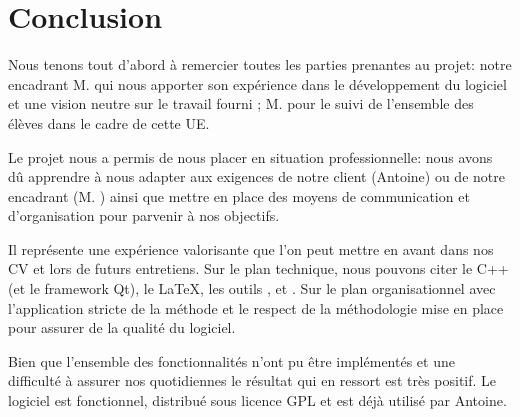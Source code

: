 \chapter*{Conclusion}
Nous tenons tout d'abord à remercier toutes les parties prenantes au projet: notre encadrant M.  qui nous apporter son expérience dans le développement du logiciel et une vision neutre sur le travail fourni ; M.  pour le suivi de l'ensemble des élèves dans le cadre de cette UE. 

Le projet \FactDev{} nous a permis de nous placer en situation professionnelle: nous avons dû apprendre à nous adapter aux exigences de notre client (Antoine) ou de notre encadrant (M. ) ainsi que mettre en place des moyens de communication et d'organisation pour parvenir à nos objectifs. 

Il représente une expérience valorisante que l'on peut mettre en avant dans nos CV et lors de futurs entretiens. Sur le plan technique, nous pouvons citer le C++ (et le framework Qt), le \LaTeX, les outils \Travis{}, \Github{} et \Coveralls. Sur le plan organisationnel avec l'application stricte de la méthode \Scrum{} et le respect de la méthodologie mise en place pour assurer de la qualité du logiciel. 

Bien que l'ensemble des fonctionnalités n'ont pu être implémentés et une difficulté à assurer nos \Melees{} quotidiennes le résultat qui en ressort est très positif. Le logiciel \FactDev{} est fonctionnel, distribué sous licence GPL et est déjà utilisé par Antoine. 